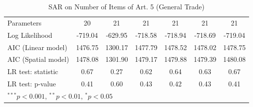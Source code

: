 \begin{table}[!h]
\begin{center}
\begin{tabular}{l c c c c c c }
Parameters              & 20           & 21           & 21           & 21           & 21           & 21           \\
Log Likelihood          & -719.04      & -629.95      & -718.58      & -718.94      & -718.69      & -719.04      \\
AIC (Linear model)      & 1476.75      & 1300.17      & 1477.79      & 1478.52      & 1478.02      & 1478.75      \\
AIC (Spatial model)     & 1478.08      & 1301.90      & 1479.17      & 1479.88      & 1479.39      & 1480.08      \\
LR test: statistic      & 0.67         & 0.27         & 0.62         & 0.64         & 0.63         & 0.67         \\
LR test: p-value        & 0.41         & 0.60         & 0.43         & 0.42         & 0.43         & 0.41         \\
\bottomrule
\multicolumn{7}{l}{\scriptsize{$^{***}p<0.001$, $^{**}p<0.01$, $^*p<0.05$}}
\end{tabular}
\caption{SAR on Number of Items of Art. 5 (General Trade)}
\label{table:coefficients}
\end{center}
\end{table}
